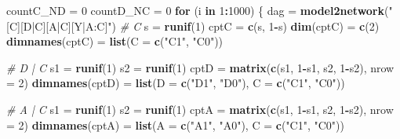 \documentclass[
]{article}
\newenvironment{Shaded}{\begin{snugshade}}{\end{snugshade}}
\newcommand{\AttributeTok}[1]{\textcolor[rgb]{0.13,0.29,0.53}{#1}}
\newcommand{\CommentTok}[1]{\textcolor[rgb]{0.56,0.35,0.01}{\textit{#1}}}
\newcommand{\ControlFlowTok}[1]{\textcolor[rgb]{0.13,0.29,0.53}{\textbf{#1}}}
\newcommand{\DecValTok}[1]{\textcolor[rgb]{0.00,0.00,0.81}{#1}}
\newcommand{\FunctionTok}[1]{\textcolor[rgb]{0.13,0.29,0.53}{\textbf{#1}}}
\newcommand{\NormalTok}[1]{#1}
\newcommand{\OtherTok}[1]{\textcolor[rgb]{0.56,0.35,0.01}{#1}}
\newcommand{\SpecialCharTok}[1]{\textcolor[rgb]{0.81,0.36,0.00}{\textbf{#1}}}
\newcommand{\StringTok}[1]{\textcolor[rgb]{0.31,0.60,0.02}{#1}}
\begin{document}
\begin{Shaded}
\begin{Highlighting}[]
\NormalTok{countC\_ND }\OtherTok{=} \DecValTok{0}
\NormalTok{countD\_NC }\OtherTok{=} \DecValTok{0}
\ControlFlowTok{for}\NormalTok{ (i }\ControlFlowTok{in} \DecValTok{1}\SpecialCharTok{:}\DecValTok{1000}\NormalTok{) \{}
\NormalTok{  dag }\OtherTok{=} \FunctionTok{model2network}\NormalTok{(}\StringTok{"[C][D|C][A|C][Y|A:C]"}\NormalTok{)}
  \CommentTok{\# C}
\NormalTok{  s }\OtherTok{=} \FunctionTok{runif}\NormalTok{(}\DecValTok{1}\NormalTok{)}
\NormalTok{  cptC }\OtherTok{=} \FunctionTok{c}\NormalTok{(s, }\DecValTok{1}\SpecialCharTok{{-}}\NormalTok{s)}
  \FunctionTok{dim}\NormalTok{(cptC) }\OtherTok{=} \FunctionTok{c}\NormalTok{(}\DecValTok{2}\NormalTok{)}
  \FunctionTok{dimnames}\NormalTok{(cptC) }\OtherTok{=} \FunctionTok{list}\NormalTok{(}\AttributeTok{C =} \FunctionTok{c}\NormalTok{(}\StringTok{"C1"}\NormalTok{, }\StringTok{"C0"}\NormalTok{))}

  \CommentTok{\# D | C}
\NormalTok{  s1 }\OtherTok{=} \FunctionTok{runif}\NormalTok{(}\DecValTok{1}\NormalTok{)}
\NormalTok{  s2 }\OtherTok{=} \FunctionTok{runif}\NormalTok{(}\DecValTok{1}\NormalTok{)}
\NormalTok{  cptD }\OtherTok{=} \FunctionTok{matrix}\NormalTok{(}\FunctionTok{c}\NormalTok{(s1, }\DecValTok{1}\SpecialCharTok{{-}}\NormalTok{s1,  }
\NormalTok{                 s2, }\DecValTok{1}\SpecialCharTok{{-}}\NormalTok{s2),}
               \AttributeTok{nrow =} \DecValTok{2}\NormalTok{)}
  \FunctionTok{dimnames}\NormalTok{(cptD) }\OtherTok{=} \FunctionTok{list}\NormalTok{(}\AttributeTok{D =} \FunctionTok{c}\NormalTok{(}\StringTok{"D1"}\NormalTok{, }\StringTok{"D0"}\NormalTok{), }\AttributeTok{C =} \FunctionTok{c}\NormalTok{(}\StringTok{"C1"}\NormalTok{, }\StringTok{"C0"}\NormalTok{))}

   \CommentTok{\# A | C}
\NormalTok{  s1 }\OtherTok{=} \FunctionTok{runif}\NormalTok{(}\DecValTok{1}\NormalTok{)}
\NormalTok{  s2 }\OtherTok{=} \FunctionTok{runif}\NormalTok{(}\DecValTok{1}\NormalTok{)}
\NormalTok{  cptA }\OtherTok{=} \FunctionTok{matrix}\NormalTok{(}\FunctionTok{c}\NormalTok{(s1, }\DecValTok{1}\SpecialCharTok{{-}}\NormalTok{s1,  }
\NormalTok{                 s2, }\DecValTok{1}\SpecialCharTok{{-}}\NormalTok{s2),}
               \AttributeTok{nrow =} \DecValTok{2}\NormalTok{)}
  \FunctionTok{dimnames}\NormalTok{(cptA) }\OtherTok{=} \FunctionTok{list}\NormalTok{(}\AttributeTok{A =} \FunctionTok{c}\NormalTok{(}\StringTok{"A1"}\NormalTok{, }\StringTok{"A0"}\NormalTok{), }\AttributeTok{C =} \FunctionTok{c}\NormalTok{(}\StringTok{"C1"}\NormalTok{, }\StringTok{"C0"}\NormalTok{))}
  

\end{Highlighting}
\end{Shaded}
\end{document}
